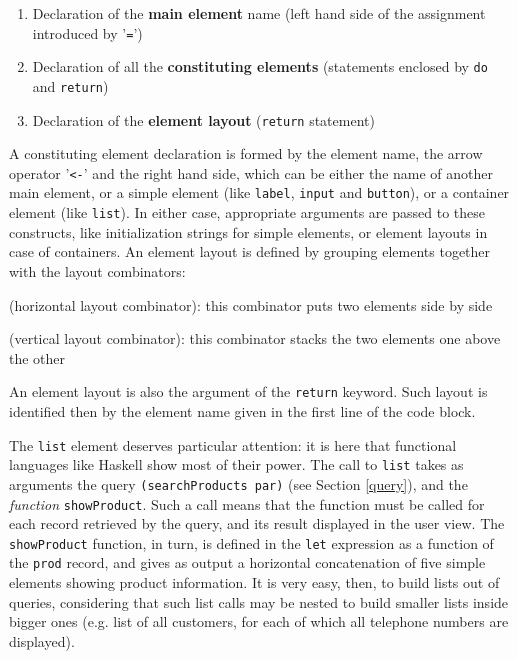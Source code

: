 \documentclass[12pt]{article} %
\newcommand{\myverb}[1]{\texttt{\footnotesize #1}}
\newcommand{\Hs}{Haskell}
\begin{document}
\begin{enumerate}
\item Declaration of the \textbf{main element} name (left hand side of the assignment introduced by '\myverb{=}')
\item Declaration of all the \textbf{constituting elements} (statements enclosed by \myverb{do} and \myverb{return})
\item Declaration of the \textbf{element layout} (\myverb{return} statement)
\end{enumerate}

A constituting element declaration is formed by the element name, the arrow operator '\myverb{<-}' and the right hand side, which can be either the name of another main element, or a simple element (like \myverb{label}, \myverb{input} and \myverb{button}), or a container element (like \myverb{list}). In either case, appropriate arguments are passed to these constructs, like initialization strings for simple elements, or element layouts in case of containers. 
An element layout is defined by grouping elements together with the layout combinators:
\begin{description}
\item \myverb{<|>} (horizontal layout combinator): this combinator puts two elements side by side
\item \myverb{<->} (vertical layout combinator): this combinator stacks the two elements one above the other
\end{description}
An element layout is also the argument of the \myverb{return} keyword. Such layout is identified then by the element name given in the first line of the code block. 

The \myverb{list} element deserves particular attention: it is here that functional languages like \Hs{} show most of their power. The call to \myverb{list} takes as arguments the query \myverb{(searchProducts par)} (see Section \ref{query}), and the \emph{function} \myverb{showProduct}. Such a call means that the function must be called for each record retrieved by the query, and its result displayed in the user view. The \myverb{showProduct} function, in turn, is defined in the \myverb{let} expression as a function of the \myverb{prod} record, and gives as output a horizontal concatenation of five simple elements showing product information. It is very easy, then, to build lists out of queries, considering that such list calls may be nested to build smaller lists inside bigger ones (e.g. list of all customers, for each of which all telephone numbers are displayed).
\end{document}
